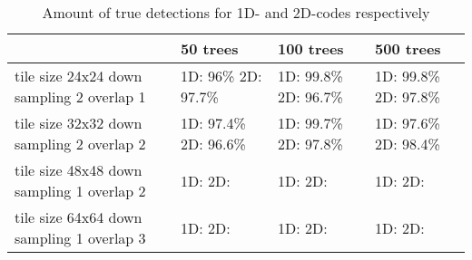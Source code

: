 \begin{table}[H]
\begin{center}
     \begin{tabular}{ | p{3cm} | p{2cm} | p{2cm} | p{2cm}|}
     \hline
      	& 50 trees & 100 trees & 500 trees \\ \hline
   	 tile size 24x24 \newline down sampling 2 \newline overlap 1 &
   	1D: 96\%  \newline 2D: 97.7\% & 1D: 99.8\%  \newline 2D: 96.7\% & 1D: 99.8\%  \newline 2D: 97.8\%				\\ \hline
     tile size 32x32 \newline down sampling 2 \newline overlap 2 &
   1D: 97.4\% \newline 2D: 96.6\% &  1D: 99.7\%  \newline 2D: 97.8\% & 1D: 97.6\%  \newline 2D: 98.4\%			\\ \hline
     tile size 48x48 \newline down sampling 1 \newline overlap 2 &
   1D:  \newline 2D:  &  1D:  \newline 2D:  & 1D: \newline 2D:
     \\ \hline
     tile size 64x64 \newline down sampling 1 \newline overlap 3 
     & 1D: \newline 2D: & 1D: \newline 2D:  & 1D: \newline 2D: 		 \\ \hline
     \end{tabular}
\end{center}
\caption{Amount of true detections for 1D- and 2D-codes respectively}
\label{tabel:trueRF}
\end{table}

